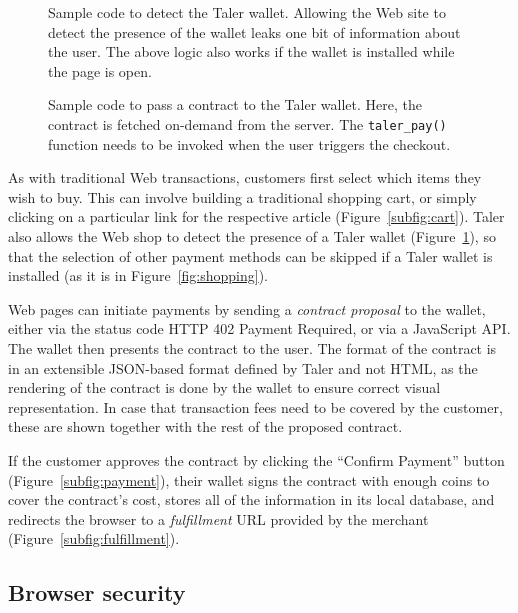 \documentclass{llncs}
\begin{document}
\begin{figure}[h!]
 \lstset{language=HTML5}
 
 \caption{Sample code to detect the Taler wallet. Allowing the
  Web site to detect the presence of the wallet leaks one bit
  of information about the user. The above logic also works
  if the wallet is installed while the page is open.}
  \label{listing:presence}
\end{figure}


\begin{figure}[h!]
 \lstset{language=JavaScript}
 
 \caption{Sample code to pass a contract to the Taler wallet.
          Here, the contract is fetched on-demand from the server.
          The {\tt taler\_pay()} function needs to be invoked
          when the user triggers the checkout.}
 \label{listing:contract}
\end{figure}


As with traditional Web transactions, customers first select which
items they wish to buy.  This can involve building a traditional
shopping cart, or simply clicking on a particular link for the
respective article (Figure~\ref{subfig:cart}).
Taler also allows the Web shop to detect
the presence of a Taler wallet (Figure~\ref{listing:presence}), so
that the selection of other payment methods can be skipped
if a Taler wallet is installed (as it is in Figure~\ref{fig:shopping}).

Web pages can initiate payments by sending a \emph{contract proposal} to the
wallet, either via the status code HTTP 402 Payment Required, or via a
JavaScript API.  The wallet then presents the contract to the user.  The format
of the contract is in an extensible JSON-based format defined by Taler and not
HTML, as the rendering of the contract is done by the wallet to ensure correct
visual representation.  In case that transaction fees need to be covered by the
customer, these are shown together with the rest of the proposed contract.

If the customer approves the contract by clicking the ``Confirm
Payment'' button (Figure~\ref{subfig:payment}), their wallet signs the
contract with enough coins to cover the contract's cost, stores all of
the information in its local database, and redirects the browser to a
{\em fulfillment} URL provided by the merchant
(Figure~\ref{subfig:fulfillment}).

\subsection{Browser security}
\end{document}
